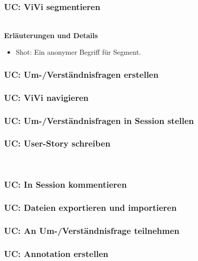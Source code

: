 \subsubsection{UC: ViVi segmentieren}

\\[0.5cm]
\textbf{Erläuterungen und Details}
\begin{itemize}
	\item Shot: Ein anonymer Begriff für Segment.
\end{itemize}
\pagebreak

\subsubsection{UC: Um-/Verständnisfragen erstellen}

\pagebreak

\subsubsection{UC: ViVi navigieren}

\pagebreak

\subsubsection{UC: Um-/Verständnisfragen in Session stellen}

\pagebreak

\subsubsection{UC: User-Story schreiben}

\\[0.5cm]
\pagebreak

\subsubsection{UC: In Session kommentieren}

\pagebreak

\subsubsection{UC: Dateien exportieren und importieren}

\pagebreak

\subsubsection{UC: An Um-/Verständnisfrage teilnehmen}

\pagebreak

\subsubsection{UC: Annotation erstellen}

\pagebreak
